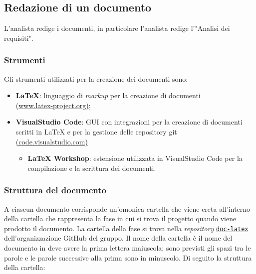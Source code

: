 \subsection{Redazione di un documento}
\label{redazione-documento}

L'analista redige i documenti, in particolare l'analista redige l'"Analisi dei
requisiti".

\subsubsection{Strumenti}
Gli strumenti utilizzati per la creazione dei documenti sono:
\begin{itemize}
	\item \textbf{LaTeX}: linguaggio di \textit{markup} per la creazione di documenti \\
	      \href{https://www.latex-project.org/}{(www.latex-project.org)};
	\item \textbf{VisualStudio Code}: GUI con integrazioni per la creazione di documenti scritti in LaTeX e per la gestione delle repository git \\
	      \href{https://code.visualstudio.com/}{(code.visualstudio.com)}
	      \begin{itemize}
		      \item \textbf{LaTeX Workshop}: estensione utilizzata in VisualStudio Code per la compilazione e la scrittura dei documenti.
	      \end{itemize}
\end{itemize}

\subsubsection{Struttura del documento}

A ciascun documento corrisponde un'omonica cartella che viene creta all'interno
della cartella che rappresenta la fase in cui si trova il progetto quando viene
prodotto il documento. La cartella della fase si trova nella \textit{repository}
\href{https://github.com/Project-SWEnergy/doc-latex}{\texttt{doc-latex}}
dell'organizzazione GitHub del gruppo.
Il nome della cartella è il nome del documento in deve avere la prima lettera
maiuscola; sono previsti gli spazi tra le parole e le parole successive alla
prima sono in minuscolo. Di seguito la struttura della cartella:

\vspace{0.5cm}


